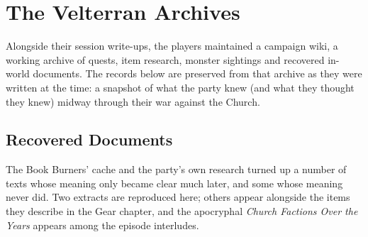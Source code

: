\section{The Velterran Archives}

Alongside their session write-ups, the players maintained a campaign wiki, a working archive of quests, item research, monster sightings and recovered in-world documents. The records below are preserved from that archive as they were written at the time: a snapshot of what the party knew (and what they thought they knew) midway through their war against the Church.

\subsection*{Recovered Documents}

The Book Burners' cache and the party's own research turned up a number of texts whose meaning only became clear much later, and some whose meaning never did. Two extracts are reproduced here; others appear alongside the items they describe in the Gear chapter, and the apocryphal \textit{Church Factions Over the Years} appears among the episode interludes.

